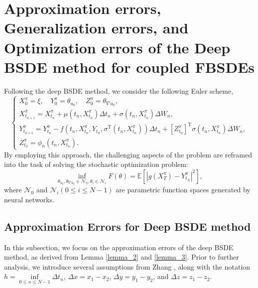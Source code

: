 \documentclass[11pt]{article}
\begin{document}
\section{Approximation errors, Generalization errors, and Optimization errors of the Deep BSDE method for coupled FBSDEs}\label{s3}
Following the deep BSDE method, we consider the following Euler scheme,
\begin{equation}\label{system}
	\left\{\begin{array}{l}
		{X}_0^\pi=\xi, \quad Y_0^\pi=\theta_{{u_0}}, \quad Z_0^\pi=\theta_{\nabla{u_0}}, \\
		{X}_{t_{n+1}}^\pi = {X}_{t_n}^\pi + \mu\left(t_n, {X}_{t_n}^\pi \right)\Delta t_n + 
		\sigma \left(t_n, {X}_{t_n}^\pi \right) \Delta W_n, \\
		Y_{t_{n+1}}^\pi = Y_{t_n}^\pi - f\left(t_n, {X}_{t_n}^\pi, Y_{t_n}, \sigma^{\mathrm{T}}\left(t_n, {X}_{t_n}^\pi \right)  \right)\Delta t_n+ \left[Z_{t_n}^\pi\right]^{\mathrm{T}} \sigma \left(t_n, {X}_{t_n}^\pi \right)  \Delta W_n, \\
		Z_{t_{n}}^\pi = \phi_n\left(t_n, {X}_{t_n}^\pi\right).
	\end{array}\right.
\end{equation}
By employing this approach, the challenging aspects of the problem are reframed into the task of solving the stochastic optimization problem:
\begin{equation}\label{optimization}
	\mathop {\inf }\limits_{ {\theta _{{u_0}}},{\theta _{\nabla {u_0}}}  \in {\mathcal{N}_0},{\theta _i} \in {\mathcal{N}_i}} F(\theta) =\mathbb{E} \left[ {{\left| {g \left( {{X}_T^\pi} \right) - Y_{t_N}^\pi } \right|}^2}  \right],
\end{equation}
where $\mathcal{N}_0$ and $\mathcal{N}_i (0  \le  i \le N - 1)$ are parametric function spaces generated by neural networks. 


\subsection{Approximation Errors for Deep BSDE method}
In this subsection, we focus on the approximation errors of the deep BSDE method, as derived from Lemma \ref{lemma_2} and \ref{lemma_3}.
Prior to further analysis, we introduce several assumptions from Zhang \textsuperscript{\cite{Zhang}}, along with the notation $h = \mathop {\inf }\limits_{0 \le n \le N-1} \Delta {t_n}$, $\Delta x = x_1 - x_2$, $\Delta y = y_1 - y_2$, and $\Delta z = z_1 - z_2$.
\end{document}
